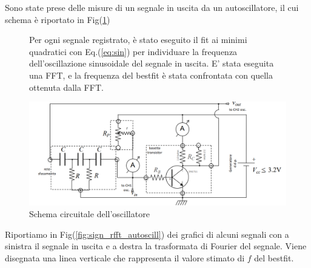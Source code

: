 \documentclass{article}
\begin{document}
    Sono state prese delle misure di un segnale in uscita da un autoscillatore, il cui schema è riportato in Fig(\ref{fig:circuitino_oscillante})
        \begin{figure}[H]
        \begin{minipage}{0.445\textwidth}
            Per ogni segnale registrato, è stato eseguito il fit ai minimi quadratici con 
            Eq.(\ref{eq:sin}) per individuare la frequenza dell'oscillazione sinusoidale 
            del segnale in uscita.
            E' stata eseguita una FFT, e la frequenza del bestfit  è stata confrontata con 
            quella ottenuta dalla FFT.
        \end{minipage}
        \hfill
        \begin{minipage}{0.45\textwidth}
            \centering
            \includegraphics[width=\textwidth]{FFT11/schema_circuitino.png}
            \caption{Schema circuitale dell'oscillatore}
            \label{fig:circuitino_oscillante}
        \end{minipage}
        \end{figure}

    Riportiamo in Fig(\ref{fig:sign_rfft_autoscill}) dei grafici di alcuni segnali con
     a sinistra il segnale in uscita e a destra la trasformata di Fourier del segnale.
    Viene disegnata una linea verticale che rappresenta il valore stimato di $f$ del bestfit.
    
\end{document}
